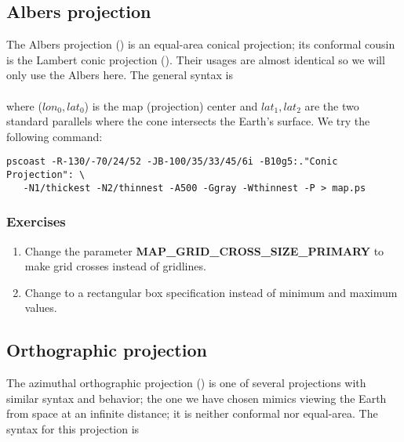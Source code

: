 \documentclass[11pt]{report}
\begin{document}
\subsection{Albers projection}

The Albers projection () is an equal-area conical projection;
its conformal cousin is the Lambert conic projection ().
Their usages are almost identical so we will only use the Albers here.
The general syntax is \\

 \\

\noindent
where ($lon_0, lat_0$) is the map (projection) center and $lat_1, lat_2$
are the two standard parallels where the cone intersects the Earth's surface.
We try the following command:

{\small\begin{verbatim}
pscoast -R-130/-70/24/52 -JB-100/35/33/45/6i -B10g5:."Conic Projection": \
   -N1/thickest -N2/thinnest -A500 -Ggray -Wthinnest -P > map.ps
\end{verbatim}
}

\subsubsection{Exercises}

\begin{enumerate}

\item Change the parameter \textbf{MAP\_GRID\_CROSS\_SIZE\_PRIMARY} to make grid crosses instead of gridlines.

\item Change  to a rectangular box specification instead of
minimum and maximum values.

\end{enumerate}

\subsection{Orthographic projection}

The azimuthal orthographic projection () is one of several
projections with similar syntax and behavior; the one we have
chosen mimics viewing the Earth from space at an infinite distance;
it is neither conformal nor equal-area.
The syntax for this projection is \\
\end{document}
